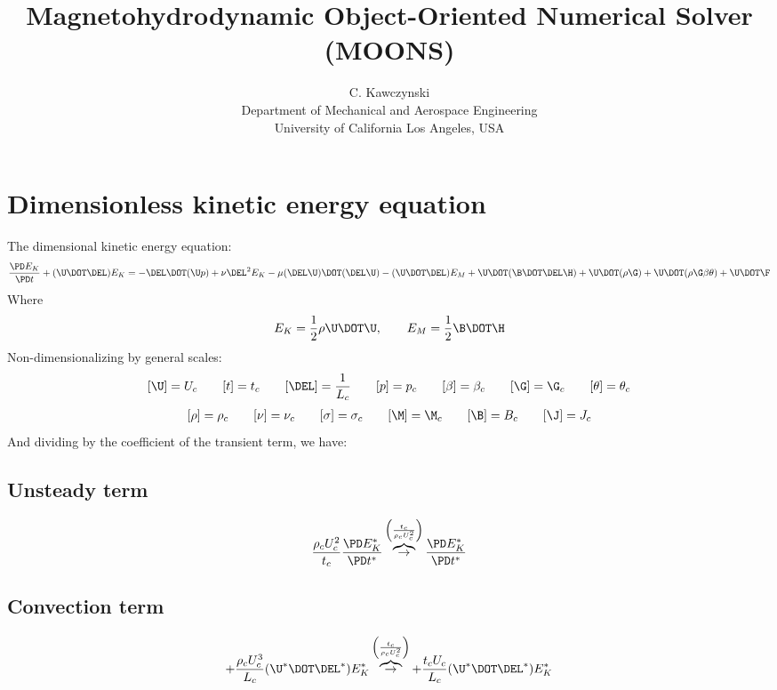 \documentclass[11pt]{article}
\newcommand{\OB}{\overbrace{\rightarrow}^{\left(\frac{t_c}{\rho_c U_c^2}\right)}}
\begin{document}
\doublespacing
\title{Magnetohydrodynamic Object-Oriented Numerical Solver (MOONS)}
\author{C. Kawczynski \\
Department of Mechanical and Aerospace Engineering \\
University of California Los Angeles, USA\\
}
\maketitle

\section{Dimensionless kinetic energy equation}
The dimensional kinetic energy equation:
\begin{equation}
	\frac{\PD E_K}{\PD t}
	+ (\U \DOT \DEL) E_K
	=
	- \DEL \DOT (\U p)
	+ \nu \DEL^2 E_K
	- \mu (\DEL \U) \DOT (\DEL \U)
	- (\U \DOT \DEL) E_M
	+ \U \DOT (\B \DOT \DEL \H)
	+ \U \DOT (\rho \G)
	+ \U \DOT (\rho \G \beta \theta)
	+ \U \DOT \F
\end{equation}
Where
\begin{equation}
	E_K = \frac{1}{2} \rho \U \DOT \U, \qquad
	E_M = \frac{1}{2} \B \DOT \H
\end{equation}
Non-dimensionalizing by general scales:
\begin{equation}\begin{aligned}
	[\U] = U_c \qquad
	[t] = t_c \qquad
	[\DEL] = \frac{1}{L_c} \qquad
	[p] = p_c \qquad
	[\beta] = \beta_c \qquad
	[\G] = \G_c \qquad
	[\theta] = \theta_c
\end{aligned}\end{equation}
\begin{equation}\begin{aligned}
	[\rho] = \rho_c \qquad
	[\nu] = \nu_c \qquad
	[\sigma] = \sigma_c \qquad
	[\M] = \M_c \qquad
	[\B] = B_c \qquad
	[\J] = J_c
\end{aligned}\end{equation}
And dividing by the coefficient of the transient term, we have:
\subsection{Unsteady term}
\begin{equation}
	\frac{\rho_c U_c^2}{t_c} \frac{\PD E_K^*}{\PD t^*}
	\OB
	\frac{\PD E_K^*}{\PD t^*}
\end{equation}
\subsection{Convection term}
\begin{equation}
	+ \frac{\rho_c U_c^3}{L_c} (\U^* \DOT \DEL^*) E_K^*
	\OB
	+ \frac{t_c U_c}{L_c} (\U^* \DOT \DEL^*) E_K^*
\end{equation}
\end{document}
